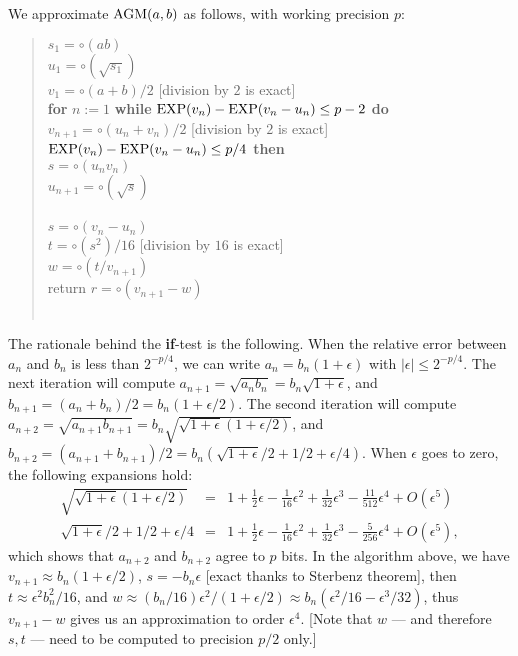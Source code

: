 \documentclass[12pt]{amsart}
\def\q{\hspace*{5mm}}
\def\Exp{{\rm EXP}}
\begin{document}
We approximate ${\rm AGM}(a,b)$ as follows, with working precision $p$:
\begin{quote}
$s_1 = \circ(a b)$ \\
$u_1 = \circ(\sqrt{s_1})$ \\
$v_1 = \circ(a + b)/2$ [division by $2$ is exact] \\
{\bf for} $n:=1$ {\bf while} $\Exp(v_n) - \Exp(v_n-u_n) \leq p-2$ {\bf do} \\
\q $v_{n+1} = \circ(u_n + v_n)/2$ [division by $2$ is exact] \\
\q {\bf if} $\Exp(v_n) - \Exp(v_n-u_n) \leq p/4$ {\bf then} \\
\q \q $s = \circ(u_n v_n)$ \\
\q \q $u_{n+1} = \circ(\sqrt{s})$ \\
\q {\bf else} \\
\q \q $s = \circ(v_n - u_n)$ \\
\q \q $t = \circ(s^2)/16$ [division by $16$ is exact] \\
\q \q $w = \circ(t/v_{n+1})$ \\
\q \q return $r = \circ(v_{n+1}-w)$ \\
\q {\bf endif} \\
\end{quote}
The rationale behind the \textbf{if}-test is the following.
When the relative error between $a_n$ and $b_n$ is less than $2^{-p/4}$,
we can write $a_n = b_n (1+\epsilon)$ with $|\epsilon| \leq 2^{-p/4}$.
The next iteration will compute
$a_{n+1} = \sqrt{a_n b_n} = b_n \sqrt{1+\epsilon}$,
and $b_{n+1} = (a_n+b_n)/2 = b_n (1+\epsilon/2)$.
The second iteration will compute $a_{n+2} = \sqrt{a_{n+1} b_{n+1}}
= b_n \sqrt{\sqrt{1+\epsilon} (1+\epsilon/2)}$,
and $b_{n+2} = (a_{n+1}+b_{n+1})/2
= b_n (\sqrt{1+\epsilon}/2 + 1/2 + \epsilon/4)$.
When $\epsilon$ goes to zero, the following expansions hold:
\begin{eqnarray*}
\sqrt{\sqrt{1+\epsilon} (1+\epsilon/2)} & = & 1 + \frac{1}{2} \epsilon
  - \frac{1}{16} \epsilon^2 + \frac{1}{32} \epsilon^3 - \frac{11}{512}
  \epsilon^4 + O(\epsilon^5) \\
\sqrt{1+\epsilon}/2 + 1/2 + \epsilon/4 & = & 1 + \frac{1}{2} \epsilon
  - \frac{1}{16} \epsilon^2 + \frac{1}{32} \epsilon^3 - \frac{5}{256}
  \epsilon^4 + O(\epsilon^5),
\end{eqnarray*}
which shows that $a_{n+2}$ and $b_{n+2}$ agree to $p$ bits.
In the algorithm above, we have $v_{n+1} \approx b_n (1+\epsilon/2)$,
$s = -b_n \epsilon$ [exact thanks to Sterbenz theorem],
then $t \approx \epsilon^2 b_n^2/16$,
and $w \approx (b_n/16) \epsilon^2/(1+\epsilon/2) \approx
b_n (\epsilon^2/16 - \epsilon^3/32)$,
thus $v_{n+1}-w$ gives us an approximation to order $\epsilon^4$.
[Note that $w$ --- and therefore $s, t$ ---
need to be computed to precision $p/2$ only.]
\end{document}
